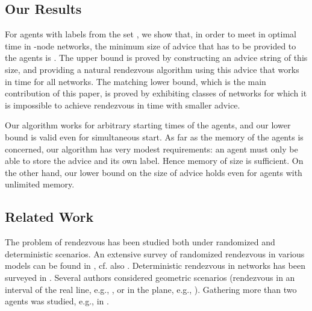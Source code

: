 \documentclass{llncs}
\begin{document}
 







\subsection{Our Results}
\label{subsec:ourresults}

For agents with labels from the set ,
we show that, in order to meet in optimal time  in -node networks, the minimum size of advice that has to be provided to the agents is  . 
The upper bound is proved by constructing an advice string of this size, and providing a natural rendezvous algorithm using this advice that works in time 
for all networks.
The matching lower bound, which is the main contribution of this paper, is proved by exhibiting classes of networks for which it is impossible to achieve rendezvous in time 
with smaller advice. 

Our algorithm works for arbitrary starting times of the agents, and our lower bound is valid even for simultaneous start.
As far as the memory of the agents is concerned, our algorithm has very modest requirements: an agent must only be able to store the advice and its own label. Hence
memory of size  is sufficient. On the other hand, our lower bound on the size of advice holds even for agents with unlimited memory.













\subsection{Related Work}
\label{subsec:relatwork}








The problem of rendezvous has been studied both under randomized and deterministic scenarios.
An extensive survey of  randomized rendezvous in various models  can be found in
\cite{alpern02b}, cf. also  \cite{alpern95a,alpern02a,anderson90,baston98}. 
Deterministic rendezvous in networks has been surveyed in \cite{Pe}.
Several authors
considered geometric scenarios (rendezvous in an interval of the real line, e.g.,  \cite{baston98,baston01},
or in the plane, e.g., \cite{anderson98a,anderson98b}).
Gathering more than two agents was studied, e.g., in \cite{fpsw,lim96,thomas92}. 
 
\end{document}
